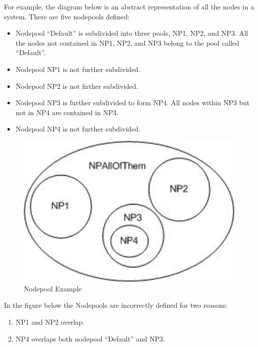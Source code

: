     For example, the diagram below is an abstract representation of all the nodes in a
    system.  There are five nodepools defined:
    \begin{itemize}
      \item Nodepool ``Default'' is subdivided into three pools, NP1, NP2, and NP3.  All
        the nodes not contained in NP1, NP2, and NP3 belong to the pool called ``Default''.
      \item Nodepool NP1 is not further subdivided.
      \item Nodepool NP2 is not firther subdivided.
      \item Nodepool NP3 is further subdivided to form NP4.  All nodes within NP3 but
        not in NP4 are contained in NP3.
      \item Nodepool NP4 is not further subdivided.
    \end{itemize}

    \begin{figure}[H]
      \centering
      \includegraphics[bb=0 0 241 161, width=5.5in]{images/Nodepool1.jpg}
      \caption{Nodepool Example}
      \label{fig:Nodepools1}
    \end{figure}

    In the figure below the Nodepools are incorrectly defined for two reasons:
    \begin{enumerate}
       \item NP1 and NP2 overlap.
       \item NP4 overlaps both nodepool ``Default'' and NP3.
    \end{enumerate}
    
